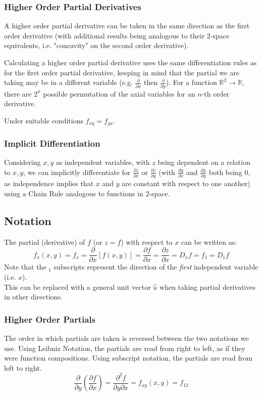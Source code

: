 \documentclass{article}
\begin{document}
\subsubsection{Higher Order Partial Derivatives}
A higher order partial derivative can be taken in the same direction as the first order derivative (with additional results being analogous to their 2-space equivalents, i.e. "concavity" on the second order derivative).

Calculating a higher order partial derivative uses the same differentiation rules as for the first order partial derivative, keeping in mind that the partial we are taking may be in a different variable (e.g. $\frac{\partial}{\partial x}$ then $\frac{\partial}{\partial y}$). For a function $\mathbb{R}^2\to\mathbb{R}$, there are $2^n$ possible permutation of the axial variables for an $n$-th order derivative.

Under suitable conditions $f_{xy} = f_{yx}$.

\subsubsection{Implicit Differentiation}
Considering $x,y$ as independent variables, with $z$ being dependent on a relation to $x,y$, we can implicitly differentiate for $\frac{\partial z}{\partial x}$ or $\frac{\partial z}{\partial y}$ (with $\frac{\partial y}{\partial x}$ and $\frac{\partial x}{\partial y}$ both being $0$, as independence implies that $x$ and $y$ are constant with respect to one another) using a Chain Rule analogous to functions in 2-space.

\subsection{Notation}
The partial (derivative) of $f$ (or $z=f$) with respect to $x$ can be written as:
\[
f_x(x,y)=f_x=\frac{\partial}{\partial x}\left[f(x,y)\right] = \frac{\partial f}{\partial x} = \frac{\partial z}{\partial x}=D_xf=f_1=D_1f
\]
Note that the $_1$ subscripts represent the direction of the \emph{first} independent variable (i.e. $x$).\\
This can be replaced with a general unit vector $\hat{u}$ when taking partial derivatives in other directions.

\subsubsection{Higher Order Partials}
The order in which partials are taken is reversed between the two notations we use. Using Leibniz Notation, the partials are read from right to left, as if they were function compositions. Using subscript notation, the partials are read from left to right.
\[
    \frac{\partial}{\partial y} \left(\frac{\partial f}{\partial x}\right) = \frac{\partial^2f}{\partial y \partial x} = f_{xy}(x,y) = f_{12}
\]
\end{document}
